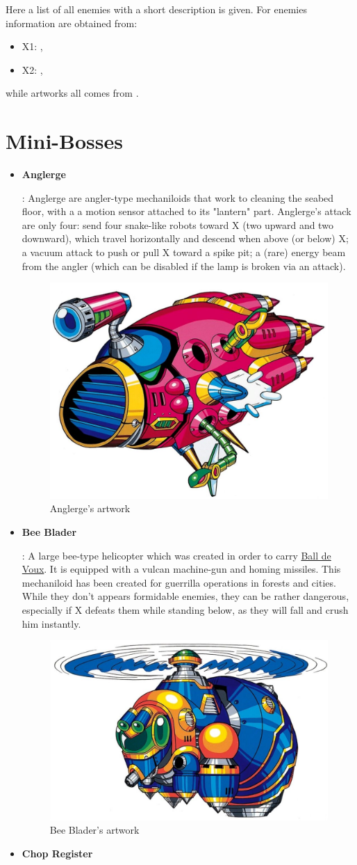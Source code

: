 Here a list of all enemies with a short description is given. For enemies information are obtained from: 
\begin{itemize}
	\item X1: \cite{wayback:X_resources},
	\item X2: \cite{wayback:X2_resources},
\end{itemize}
while artworks all comes from \cite{book:MMX_Complete_art}.

\section{Mini-Bosses}
	\begin{itemize}
		\item \hypertarget{miniboss:Anglerge}{\textbf{Anglerge}}:
		Anglerge are angler-type mechaniloids that work to cleaning the seabed floor, with a  a motion sensor attached to its "lantern" part. Anglerge's attack are only four: send four snake-like robots toward X (two upward and two downward), which travel horizontally and descend when above (or below) X; a vacuum attack to push or pull X toward a spike pit; a (rare) energy beam from the angler (which can be disabled if the lamp is broken via an attack).
		\begin{figure}[htp]
			\centering
			\includegraphics[width=0.4\linewidth]{figures/X1/Enemies/Anglerge.jpg}
			\caption{Anglerge's artwork}
		\end{figure}
	
		\item \hypertarget{miniboss:Bee_Blader}{\textbf{Bee Blader}}:
		A large bee-type helicopter which was created in order to carry \hyperlink{enem:Ball_De_Voux}{Ball de Voux}. It is equipped with a vulcan machine-gun and homing missiles. This mechaniloid has been created for guerrilla operations in forests and cities. While they don't appears formidable enemies, they can be rather dangerous, especially if X defeats them while standing below, as they will fall and crush him instantly.
		\begin{figure}[htp]
			\centering
			\includegraphics[width=0.5\linewidth]{figures/X1/Enemies/BeeBlader.jpg}
			\caption{Bee Blader's artwork}
		\end{figure}
		\item \hypertarget{miniboss:Chop_Register}{\textbf{Chop Register}}
	

\end{itemize}
